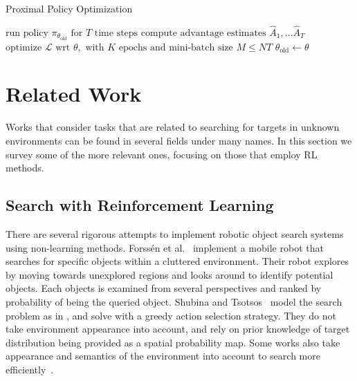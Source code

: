 \begin{algorithm}
    \caption{Proximal Policy Optimization}
    \label{alg:ppo}
    \begin{algorithmic}
                \State \(\text{run policy } \pi_{\theta_\text{old}} \text{ for } T \text{ time steps}\)
                \State \(\text{compute advantage estimates } \hat{A}_1, \dots \hat{A}_T\)
            \EndFor
            \State \(\text{optimize } \mathcal{L} \text{ wrt } \theta, \text{ with } K \text{ epochs and mini-batch size } M \leq NT\)
            \State \(\theta_{\text{old}} \leftarrow \theta\)
        \EndFor
    \end{algorithmic}
\end{algorithm}

\section{Related Work}
\label{sec:relatedwork}

Works that consider tasks that are related to searching for targets in unknown environments can be found in several fields under many names.
In this section we survey some of the more relevant ones, focusing on those that employ RL methods.

\subsection{Search with Reinforcement Learning}

There are several rigorous attempts to implement robotic object search systems using non-learning methods.
Forssén et al.~\cite{forssen_informed_2008} implement a mobile robot that searches for specific objects within a cluttered environment.
Their robot explores by moving towards unexplored regions and looks around to identify potential objects.
Each objects is examined from several perspectives and ranked by probability of being the queried object.
Shubina and Tsotsos~\cite{shubina_visual_2010} model the search problem as in \cite{ye_complexity-level_2001}, and solve with a greedy action selection strategy.
They do not take environment appearance into account, and rely on prior knowledge of target distribution being provided as a spatial probability map.
Some works also take appearance and semantics of the environment into account to search more efficiently~\cite{aydemir_search_2011,aydemir_active_2013}.


